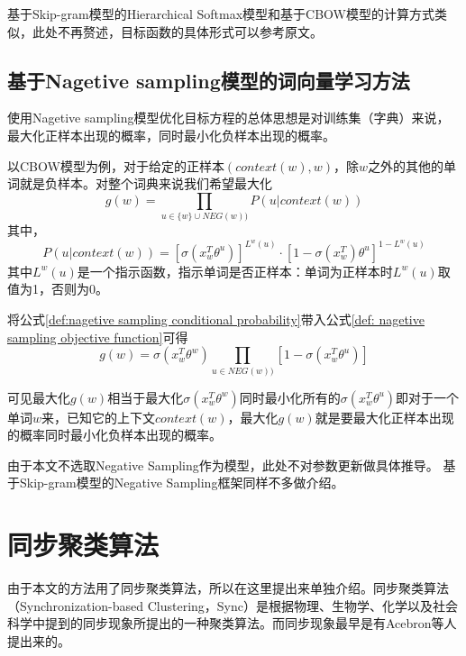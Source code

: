 基于Skip-gram模型的Hierarchical Softmax模型和基于CBOW模型的计算方式类似，此处不再赘述，目标函数的具体形式可以参考原文\cite{mikolov2013distributed}。

\subsection{基于Nagetive sampling模型的词向量学习方法}
使用Nagetive sampling模型优化目标方程的总体思想是对训练集（字典）来说，最大化正样本出现的概率，同时最小化负样本出现的概率。

以CBOW模型为例，对于给定的正样本$(context(w), w)$，除$w$之外的其他的单词就是负样本。对整个词典来说我们希望最大化
\begin{equation}
g(w) = \prod_{u \in \{w\}\cup NEG(w))} P(u|context(w))
\label{def: nagetive sampling objective function}
\end{equation}
其中，
\begin{equation}
P(u|context(w)) = [\sigma(x_{w}^{T}\theta^u) ]^{L^w(u)}\cdot [1-\sigma(x_{w}^{T})\theta^u]^{1-L^w(u)}
\label{def:nagetive sampling conditional probability}
\end{equation}
其中$L^w(u)$是一个指示函数，指示单词是否正样本：单词为正样本时$L^w(u)$取值为1，否则为0。

将公式\ref{def:nagetive sampling conditional probability}带入公式\ref{def: nagetive sampling objective function}可得
\begin{equation}{}
g(w) = \sigma(x_{w}^{T}\theta^w)\prod_{u \in NEG(w))}[1- \sigma(x_{w}^{T}\theta^u)] 
\end{equation}

可见最大化$g(w)$相当于最大化$\sigma(x_{w}^{T}\theta^w)$同时最小化所有的$\sigma(x_{w}^{T}\theta^u)$即对于一个单词$w$来，已知它的上下文$context(w)$，最大化$g(w)$就是要最大化正样本出现的概率同时最小化负样本出现的概率。

由于本文不选取Negative Sampling作为模型，此处不对参数更新做具体推导。
基于Skip-gram模型的Negative Sampling框架同样不多做介绍。



\section{同步聚类算法}
由于本文的方法用了同步聚类算法，所以在这里提出来单独介绍。同步聚类算法（Synchronization-based Clustering，Sync）是根据物理、生物学、化学以及社会科学中提到的同步现象所提出的一种聚类算法。而同步现象最早是有Acebron等人提出来的\cite{acebron2005kuramoto}。


